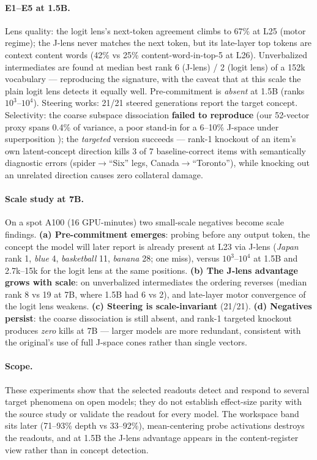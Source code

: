 \documentclass[11pt]{article}
\newcommand{\jlens}{J\mbox{-}lens}
\begin{document}
\paragraph{E1--E5 at 1.5B.} Lens quality: the logit lens's next-token agreement climbs to 67\% at L25 (motor regime); the \jlens{} never matches the next token, but its late-layer top tokens are context content words (42\% vs 25\% content-word-in-top-5 at L26). Unverbalized intermediates are found at median best rank 6 (\jlens{}) / 2 (logit lens) of a 152k vocabulary --- reproducing the signature, with the caveat that at this scale the plain logit lens detects it equally well. Pre-commitment is \emph{absent} at 1.5B (ranks $10^3$--$10^4$). Steering works: 21/21 steered generations report the target concept. Selectivity: the coarse subspace dissociation \textbf{failed to reproduce} (our 52-vector proxy spans 0.4\% of variance, a poor stand-in for a 6--10\% J-space under superposition \citep{elhage2022}); the \emph{targeted} version succeeds --- rank-1 knockout of an item's own latent-concept direction kills 3 of 7 baseline-correct items with semantically diagnostic errors (spider$\to$``Six'' legs, Canada$\to$``Toronto''), while knocking out an unrelated direction causes zero collateral damage.

\paragraph{Scale study at 7B.} On a spot A100 (16 GPU-minutes) two small-scale negatives become scale findings. \textbf{(a) Pre-commitment emerges}: probing before any output token, the concept the model will later report is already present at L23 via \jlens{} (\emph{Japan} rank 1, \emph{blue} 4, \emph{basketball} 11, \emph{banana} 28; one miss), versus $10^3$--$10^4$ at 1.5B and 2.7k--15k for the logit lens at the same positions. \textbf{(b) The \jlens{} advantage grows with scale}: on unverbalized intermediates the ordering reverses (median rank 8 vs 19 at 7B, where 1.5B had 6 vs 2), and late-layer motor convergence of the logit lens weakens. \textbf{(c) Steering is scale-invariant} (21/21). \textbf{(d) Negatives persist}: the coarse dissociation is still absent, and rank-1 targeted knockout produces \emph{zero} kills at 7B --- larger models are more redundant, consistent with the original's use of full J-space cones rather than single vectors.

\paragraph{Scope.} These experiments show that the selected readouts detect and respond to several target phenomena on open models; they do not establish effect-size parity with the source study or validate the readout for every model. The workspace band sits later (71--93\% depth vs 33--92\%), mean-centering probe activations destroys the readouts, and at 1.5B the \jlens{} advantage appears in the content-register view rather than in concept detection.
\end{document}
